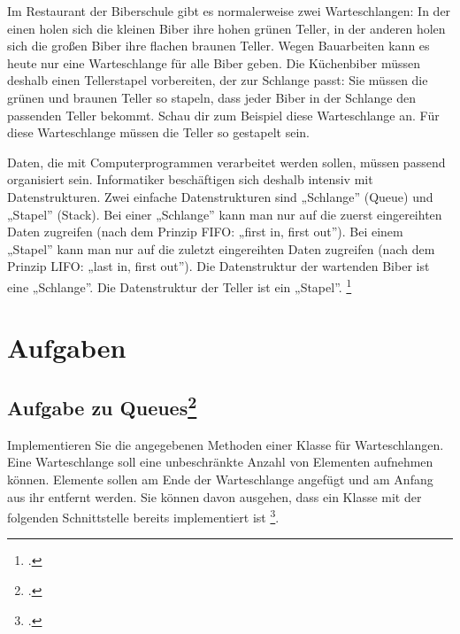 \documentclass{lehramt-informatik}
\begin{document}
Im Restaurant der Biberschule gibt es normalerweise zwei Warteschlangen:
In der einen holen sich die kleinen Biber ihre hohen grünen Teller, in
der anderen holen sich die großen Biber ihre flachen braunen Teller.
Wegen Bauarbeiten kann es heute nur eine Warteschlange für alle Biber
geben. Die Küchenbiber müssen deshalb einen Tellerstapel vorbereiten,
der zur Schlange passt: Sie müssen die grünen und braunen Teller so
stapeln, dass jeder Biber in der Schlange den passenden Teller bekommt.
Schau dir zum Beispiel diese Warteschlange an. Für diese Warteschlange
müssen die Teller so gestapelt sein.

Daten, die mit Computerprogrammen verarbeitet werden sollen, müssen
passend organisiert sein. Informatiker beschäftigen sich deshalb
intensiv mit Datenstrukturen. Zwei einfache Datenstrukturen sind
„Schlange” (Queue) und „Stapel” (Stack). Bei einer „Schlange” kann man
nur auf die zuerst eingereihten Daten zugreifen (nach dem Prinzip FIFO:
„first in, first out”). Bei einem „Stapel” kann man nur auf die zuletzt
eingereihten Daten zugreifen (nach dem Prinzip LIFO: „last in, first
out”). Die Datenstruktur der wartenden Biber ist eine „Schlange”. Die
Datenstruktur der Teller ist ein „Stapel”.
\footcite[Seite 35]{net:pdf:informatik-biber-2010}


\chapter{Aufgaben}

%

\section{Aufgabe zu Queues\footcite[Seite 1-2, Aufgabe 2: Queue Frühjahr 2007, Thema 1, A7]{aud:pu:4}}

Implementieren Sie die angegebenen Methoden einer Klasse 
für Warteschlangen. Eine Warteschlange soll eine unbeschränkte Anzahl
von Elementen aufnehmen können. Elemente sollen am Ende der
Warteschlange angefügt und am Anfang aus ihr entfernt werden. Sie können
davon ausgehen, dass ein Klasse  mit der folgenden
Schnittstelle bereits implementiert ist
\footcite[Seite 3]{examen:66115:2007:03}.
\end{document}
